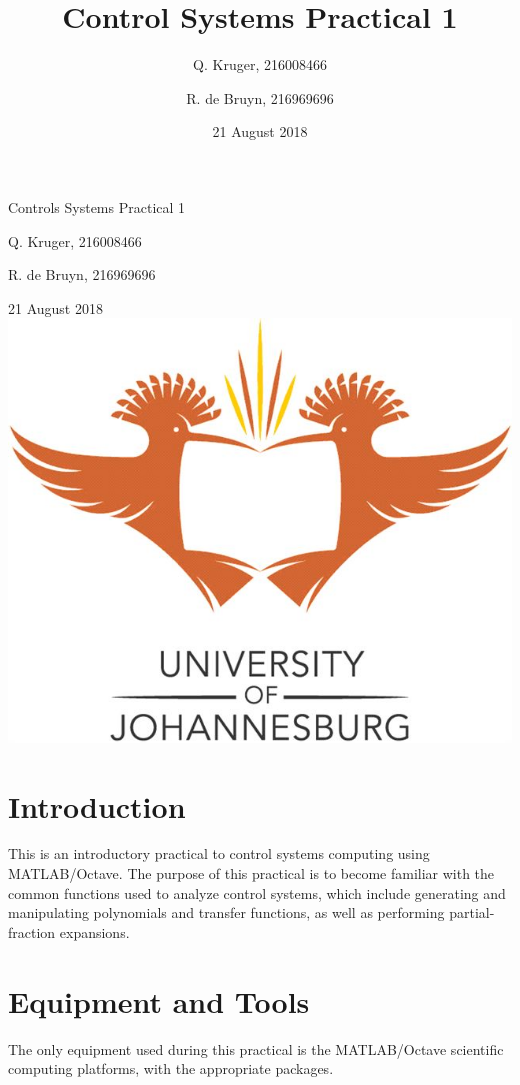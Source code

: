 \documentclass[12pt, a4paper]{article}
\title{Control Systems Practical 1}
\date{21 August 2018}
\author{Q. Kruger, 216008466 \and R. de Bruyn, 216969696}
\begin{document}
	\begin{titlepage}
		\centering
		{\LARGE Controls Systems Practical 1 \par}
		\vspace*{1.5cm}
		{\large Q. Kruger, 216008466 \par}
		{\large R. de Bruyn, 216969696 \par}
		{\large 21 August 2018}
		\vspace*{\fill}
		\includegraphics[width=\textwidth]{img/UJ.jpg}
		\vspace*{\fill}
	\end{titlepage}
	\tableofcontents
	\newpage
	
	\section{Introduction} %
	\label{sec:introduction}
		This is an introductory practical to control systems computing using MATLAB/Octave. The purpose of this practical is to become familiar with the common functions used to analyze control systems, which include generating and manipulating polynomials and transfer functions, as well as performing partial-fraction expansions.

	\section{Equipment and Tools} %
	\label{sec:equipment_and_tools}
		The only equipment used during this practical is the MATLAB/Octave scientific computing platforms, with the appropriate packages.
\end{document}
